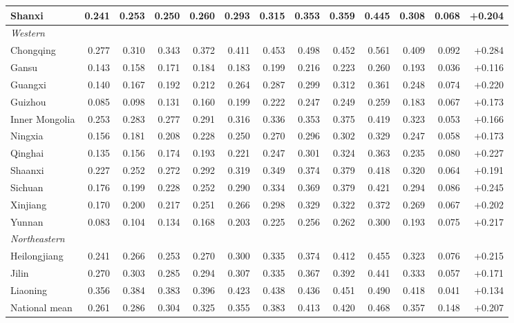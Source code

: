 \begin{tabular}{lrrrrrrrrrrrr}
Shanxi & 0.241 & 0.253 & 0.250 & 0.260 & 0.293 & 0.315 & 0.353 & 0.359 & 0.445 & 0.308 & 0.068 & +0.204 \\
\midrule
\multicolumn{13}{l}{\textit{Western}} \\
Chongqing & 0.277 & 0.310 & 0.343 & 0.372 & 0.411 & 0.453 & 0.498 & 0.452 & 0.561 & 0.409 & 0.092 & +0.284 \\
Gansu & 0.143 & 0.158 & 0.171 & 0.184 & 0.183 & 0.199 & 0.216 & 0.223 & 0.260 & 0.193 & 0.036 & +0.116 \\
Guangxi & 0.140 & 0.167 & 0.192 & 0.212 & 0.264 & 0.287 & 0.299 & 0.312 & 0.361 & 0.248 & 0.074 & +0.220 \\
Guizhou & 0.085 & 0.098 & 0.131 & 0.160 & 0.199 & 0.222 & 0.247 & 0.249 & 0.259 & 0.183 & 0.067 & +0.173 \\
Inner Mongolia & 0.253 & 0.283 & 0.277 & 0.291 & 0.316 & 0.336 & 0.353 & 0.375 & 0.419 & 0.323 & 0.053 & +0.166 \\
Ningxia & 0.156 & 0.181 & 0.208 & 0.228 & 0.250 & 0.270 & 0.296 & 0.302 & 0.329 & 0.247 & 0.058 & +0.173 \\
Qinghai & 0.135 & 0.156 & 0.174 & 0.193 & 0.221 & 0.247 & 0.301 & 0.324 & 0.363 & 0.235 & 0.080 & +0.227 \\
Shaanxi & 0.227 & 0.252 & 0.272 & 0.292 & 0.319 & 0.349 & 0.374 & 0.379 & 0.418 & 0.320 & 0.064 & +0.191 \\
Sichuan & 0.176 & 0.199 & 0.228 & 0.252 & 0.290 & 0.334 & 0.369 & 0.379 & 0.421 & 0.294 & 0.086 & +0.245 \\
Xinjiang & 0.170 & 0.200 & 0.217 & 0.251 & 0.266 & 0.298 & 0.329 & 0.322 & 0.372 & 0.269 & 0.067 & +0.202 \\
Yunnan & 0.083 & 0.104 & 0.134 & 0.168 & 0.203 & 0.225 & 0.256 & 0.262 & 0.300 & 0.193 & 0.075 & +0.217 \\
\midrule
\multicolumn{13}{l}{\textit{Northeastern}} \\
Heilongjiang & 0.241 & 0.266 & 0.253 & 0.270 & 0.300 & 0.335 & 0.374 & 0.412 & 0.455 & 0.323 & 0.076 & +0.215 \\
Jilin & 0.270 & 0.303 & 0.285 & 0.294 & 0.307 & 0.335 & 0.367 & 0.392 & 0.441 & 0.333 & 0.057 & +0.171 \\
Liaoning & 0.356 & 0.384 & 0.383 & 0.396 & 0.423 & 0.438 & 0.436 & 0.451 & 0.490 & 0.418 & 0.041 & +0.134 \\
\midrule
National mean & 0.261 & 0.286 & 0.304 & 0.325 & 0.355 & 0.383 & 0.413 & 0.420 & 0.468 & 0.357 & 0.148 & +0.207 \\
\bottomrule
\end{tabular}